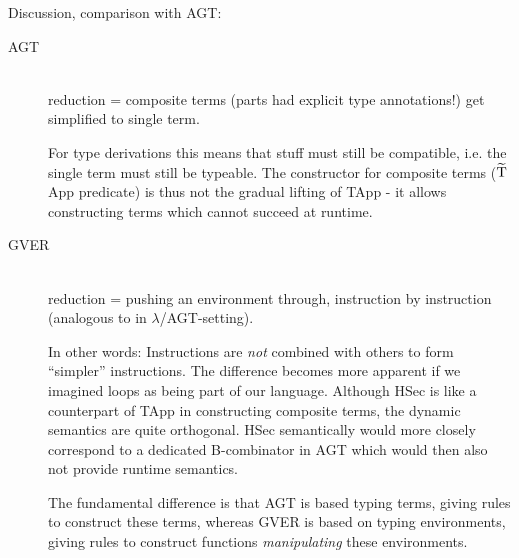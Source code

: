 \documentclass[11pt,a4paper]{article}
\begin{document}
Discussion, comparison with AGT:
\begin{description}
	\item [AGT]~\\
	reduction = composite terms (parts had explicit type annotations!) get simplified to single term.
	
	For type derivations this means that stuff must still be compatible, i.e. the single term must still be typeable.
	The constructor for composite terms ($\widetilde{\text{T}}$App predicate) is thus not the gradual lifting of TApp - it allows constructing terms which cannot succeed at runtime.
	\item [GVER]~\\
	reduction = pushing an environment through, instruction by instruction (analogous to  in $\lambda$/AGT-setting).
	
	In other words: Instructions are \textit{not} combined with others to form “simpler” instructions.
	The difference becomes more apparent if we imagined loops as being part of our language.
	Although HSec is like a counterpart of TApp in constructing composite terms, the dynamic semantics are quite orthogonal.
	HSec semantically would more closely correspond to a dedicated B-combinator in AGT which would then also not provide runtime semantics.
	
	The fundamental difference is that AGT is based typing terms, giving rules to construct these terms, whereas GVER is based on typing environments, giving rules to construct functions \textit{manipulating} these environments.
	

\end{description}
\end{document}
